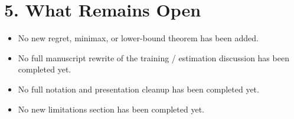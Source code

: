 \documentclass[11pt]{article}
\begin{document}
\section*{5. What Remains Open}

\begin{itemize}[leftmargin=1.5em]
    \item No new regret, minimax, or lower-bound theorem has been added.
    \item No full manuscript rewrite of the training / estimation discussion has been completed yet.
    \item No full notation and presentation cleanup has been completed yet.
    \item No new limitations section has been completed yet.
\end{itemize}
\end{document}

